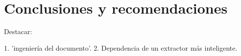 \chapter*{Conclusiones y recomendaciones} \label{chap:conclusiones}

Destacar:

1.  'ingeniería del documento'. 
2. Dependencia de un extractor más inteligente.
